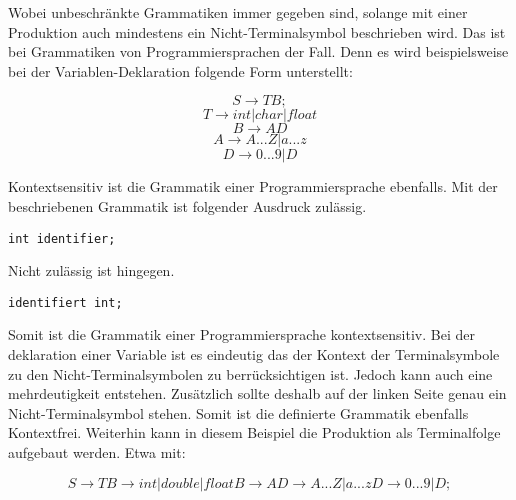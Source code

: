 \pagebreak

Wobei unbeschränkte Grammatiken immer gegeben sind, solange mit einer Produktion auch mindestens ein Nicht-Terminalsymbol beschrieben wird. Das ist bei Grammatiken von Programmiersprachen der Fall. Denn es wird beispielsweise bei der Variablen-Deklaration folgende Form unterstellt:

\begin{center}
\begin{equation}
S \to TB;
\end{equation}
\begin{equation}
T \to int | char | float
\end{equation}
\begin{equation}
B \to AD
\end{equation}
\begin{equation}
A \to A...Z|a...z
\end{equation}
\begin{equation}
D \to 0...9|D
\end{equation}
\end{center}
 
Kontextsensitiv ist die Grammatik einer Programmiersprache ebenfalls. Mit der beschriebenen Grammatik ist folgender Ausdruck zulässig.
\begin{verbatim}
int identifier;
\end{verbatim}
Nicht zulässig ist hingegen.
\begin{verbatim} 
identifiert int; 
\end{verbatim}
Somit ist die Grammatik einer Programmiersprache kontextsensitiv. 
Bei der deklaration einer Variable ist es eindeutig das der Kontext der Terminalsymbole zu den Nicht-Terminalsymbolen zu berrücksichtigen ist. Jedoch kann auch eine mehrdeutigkeit entstehen. Zusätzlich sollte deshalb auf der linken Seite genau ein Nicht-Terminalsymbol stehen. Somit ist die definierte Grammatik ebenfalls Kontextfrei. 
Weiterhin kann in diesem Beispiel die Produktion als Terminalfolge aufgebaut werden. Etwa mit: 

\begin{center}
\begin{equation}
S \to TB \to int | double | float B \to AD \to A...Z|a...z D \to 0...9|D;
\end{equation}
\end{center}

